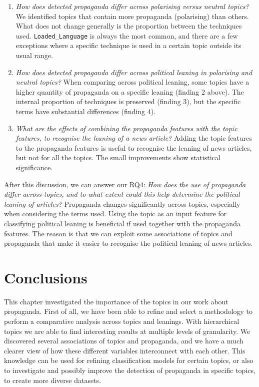 \begin{enumerate}[label={\textbf{RQ4.\arabic*:}},leftmargin=2cm]
    \item \emph{How does detected propaganda differ across polarising versus neutral topics?} We identified topics that contain more propaganda (polarising) than others. What does not change generally is the proportion between the techniques used. \texttt{Loaded\_Language} is always the most common, and there are a few exceptions where a specific technique is used in a certain topic outside its usual range.
    \item \emph{How does detected propaganda differ across political leaning in polarising and neutral topics?} When comparing across political leaning, some topics have a higher quantity of propaganda on a specific leaning (finding 2 above). The internal proportion of techniques is preserved (finding 3), but the specific terms have substantial differences (finding 4).
    \item \textit{What are the effects of combining the propaganda features with the topic features, to recognise the leaning of a news article?} Adding the topic features to the propaganda features is useful to recognise the leaning of news articles, but not for all the topics. The small improvements show statistical significance.
\end{enumerate}

After this discussion, we can answer our RQ4: \emph{How does the use of propaganda differ across topics, and to what extent could this help determine the political leaning of articles?}
Propaganda changes significantly across topics, especially when considering the terms used. Using the topic as an input feature for classifying political leaning is beneficial if used together with the propaganda features. The reason is that we can exploit some associations of topics and propaganda that make it easier to recognise the political leaning of news articles.


\section{Conclusions}
\label{sec:topic_conclusion}

This chapter investigated the importance of the topics in our work about propaganda.
First of all, we have been able to refine and select a methodology to perform a comparative analysis across topics and leanings. With hierarchical topics we are able to find interesting results at multiple levels of granularity.
We discovered several associations of topics and propaganda, and we have a much clearer view of how these different variables interconnect with each other.
This knowledge can be used for refining classification models for certain topics, or also to
investigate and possibly improve the detection of propaganda in specific topics, to create more diverse datasets.

